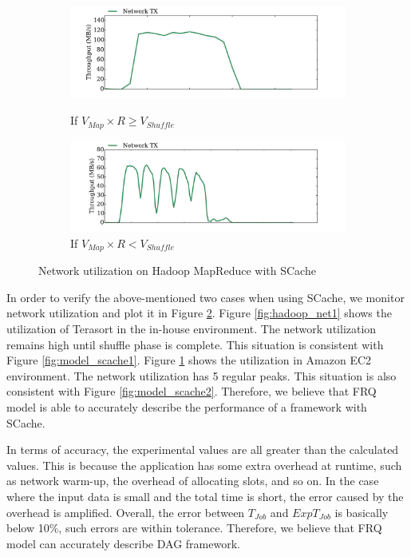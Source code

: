 {\begin{figure}
	\centering
	\begin{minipage}[hb]{\linewidth}
		\begin{subfigure}{\linewidth}
			\begin{minipage}{\linewidth}
				\includegraphics[width=\linewidth]{fig/hadoop_net1}
				\caption{\color{blue}If \(V_{Map} \times R \ge V_{Shuffle}\)}
				\label{fig:hadoop_net1}
			\end{minipage}
			\begin{minipage}{\linewidth}
				\includegraphics[width=\linewidth]{fig/hadoop_net2}
				\caption{\color{blue}If \(V_{Map} \times R < V_{Shuffle}\)}
				\label{fig:hadoop_net2}
			\end{minipage}
		\end{subfigure}
		\caption{\color{blue}Network utilization on Hadoop MapReduce with SCache}
		\label{fig:hadoop_net}
	\end{minipage}
\end{figure}

In order to verify the above-mentioned two cases when using SCache, we monitor network utilization and plot it in Figure \ref{fig:hadoop_net}. Figure \ref{fig:hadoop_net1} shows the utilization of Terasort in the in-house environment. The network utilization remains high until shuffle phase is complete. This situation is consistent with Figure \ref{fig:model_scache1}. Figure \ref{fig:hadoop_net2} shows the utilization in Amazon EC2 environment. 
The network utilization has 5 regular peaks. This situation is also consistent with Figure \ref{fig:model_scache2}. Therefore, we believe that FRQ model is able to accurately describe the performance of a framework with SCache.

In terms of accuracy, the experimental values are all greater than the calculated values. This is because the application has some extra overhead at runtime, such as network warm-up, the overhead of allocating slots, and so on. In the case where the input data is small and the total time is short, the error caused by the overhead is amplified. Overall, the error between \(T_{Job}\) and \(ExpT_{Job}\) is basically below 10\%, such errors are within tolerance. Therefore, we believe that FRQ model can accurately describe DAG framework.
}